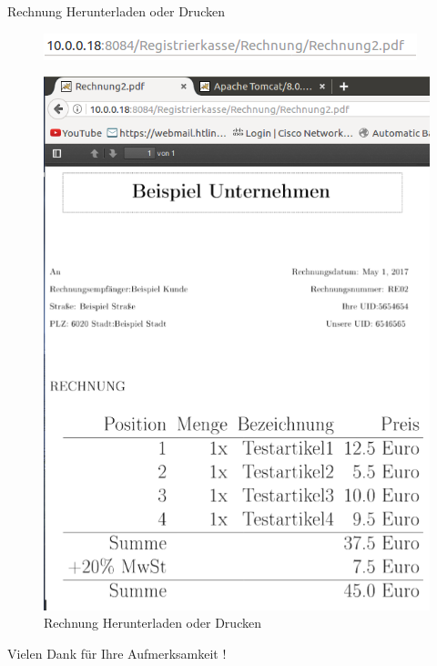 \documentclass[12pt]{beamer}
\begin{document}
\begin{frame}
	Rechnung Herunterladen oder Drucken
	\begin{figure}
		\includegraphics[scale=0.5]{Bilder/URL2.png}
\end{figure}		
	
	\begin{figure}
		\includegraphics[scale=0.2]{Bilder/rechnung.png}
		\caption{Rechnung Herunterladen oder Drucken }
\end{figure}		
	
\end{frame}


\begin{frame}
	\begin{Large}
		\begin{center}
				Vielen Dank für Ihre Aufmerksamkeit !
		\end{center}
	\end{Large}
\end{frame}
\end{document}
